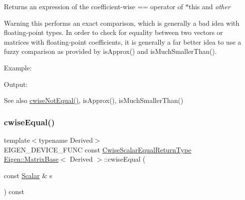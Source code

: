\begin{DoxyReturn}{Returns}
an expression of the coefficient-\/wise == operator of $\ast$this and {\itshape other} 
\end{DoxyReturn}
\begin{DoxyWarning}{Warning}
this performs an exact comparison, which is generally a bad idea with floating-\/point types. In order to check for equality between two vectors or matrices with floating-\/point coefficients, it is generally a far better idea to use a fuzzy comparison as provided by is\+Approx() and is\+Much\+Smaller\+Than().
\end{DoxyWarning}
Example\+: 
\begin{DoxyCodeInclude}{0}
\end{DoxyCodeInclude}
 Output\+: 
\begin{DoxyVerbInclude}
\end{DoxyVerbInclude}


\begin{DoxySeeAlso}{See also}
\mbox{\hyperlink{class_eigen_1_1_matrix_base_a78d22ea009bdb12a0988a1c2cb5252b2}{cwise\+Not\+Equal()}}, is\+Approx(), is\+Much\+Smaller\+Than() 
\end{DoxySeeAlso}
\mbox{\label{class_eigen_1_1_matrix_base_a5e61bcee01dbdae901280f363610f0e3}} 
\subsubsection{\texorpdfstring{cwiseEqual()}{cwiseEqual()}\hspace{0.1cm}{\footnotesize\ttfamily [2/2]}}
{\footnotesize\ttfamily template$<$typename Derived$>$ \\
E\+I\+G\+E\+N\+\_\+\+D\+E\+V\+I\+C\+E\+\_\+\+F\+U\+NC const \mbox{\hyperlink{class_eigen_1_1_cwise_binary_op}{Cwise\+Scalar\+Equal\+Return\+Type}} \mbox{\hyperlink{class_eigen_1_1_matrix_base}{Eigen\+::\+Matrix\+Base}}$<$ Derived $>$\+::cwise\+Equal (\begin{DoxyParamCaption}\item[{const \mbox{\hyperlink{class_eigen_1_1_dense_base_a5feed465b3a8e60c47e73ecce83e39a2}{Scalar}} \&}]{s }\end{DoxyParamCaption}) const\hspace{0.3cm}{\ttfamily [inline]}}

